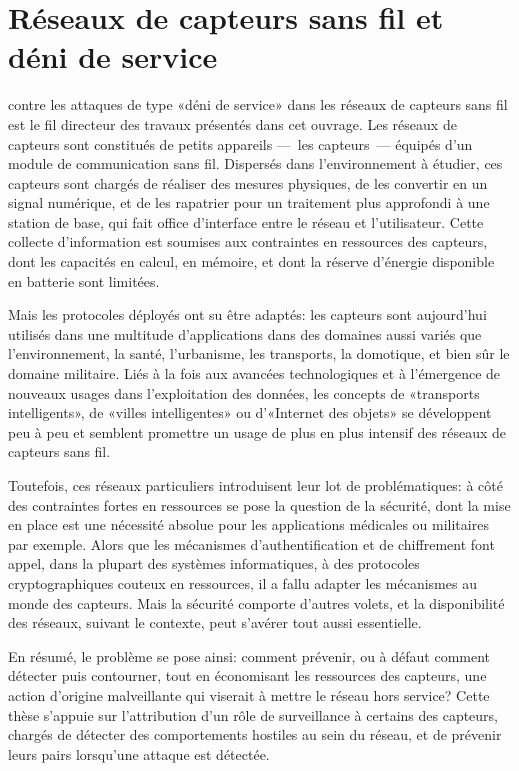 \section{Réseaux de capteurs sans fil et déni de service}

 contre les attaques de type «déni de service» dans les réseaux de capteurs sans fil est le fil directeur des travaux présentés dans cet ouvrage.\linebreak
Les réseaux de capteurs sont constitués de petits appareils ---~les capteurs~--- équipés d'un module de communication sans fil.
Dispersés dans l'environnement à étudier, ces capteurs sont chargés de réaliser des mesures physiques, de les convertir en un signal numérique, et de les rapatrier pour un traitement plus approfondi à une station de base, qui fait office d'interface entre le réseau et l'utilisateur.
Cette collecte d'information est soumises aux contraintes en ressources des capteurs, dont les capacités en calcul, en mémoire, et dont la réserve d'énergie disponible en batterie sont limitées.

Mais les protocoles déployés ont su être adaptés: les capteurs sont aujourd'hui utilisés dans une multitude d'applications dans des domaines aussi variés que l'environnement, la santé, l'urbanisme, les transports, la domotique, et bien sûr le domaine militaire.
Liés à la fois aux avancées technologiques et à l'émergence de nouveaux usages dans l'exploitation des données, les concepts de «transports intelligents», de «villes intelligentes» ou d'«Internet des objets» se développent peu à peu et semblent promettre un usage de plus en plus intensif des réseaux de capteurs sans fil.

Toutefois, ces réseaux particuliers introduisent leur lot de problématiques: à côté des contraintes fortes en ressources se pose la question de la sécurité, dont la mise en place est une nécessité absolue pour les applications médicales ou militaires par exemple.
Alors que les mécanismes d'authentification et de chiffrement font appel, dans la plupart des systèmes informatiques, à des protocoles cryptographiques couteux en ressources, il a fallu adapter les mécanismes au monde des capteurs.
Mais la sécurité comporte d'autres volets, et la disponibilité des réseaux, suivant le contexte, peut s'avérer tout aussi essentielle.

En résumé, le problème se pose ainsi: comment prévenir, ou à défaut comment détecter puis contourner, tout en économisant les ressources des capteurs, une action d'origine malveillante qui viserait à mettre le réseau hors service?
Cette thèse s'appuie sur l'attribution d'un rôle de surveillance à certains des capteurs, chargés de détecter des comportements hostiles au sein du réseau, et de prévenir leurs pairs lorsqu'une attaque est détectée.


